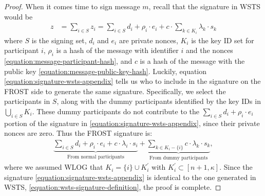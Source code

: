 \documentclass{article}
\theoremstyle{definition}
\theoremstyle{remark}
\begin{document}
\begin{proof}
When it comes time to sign message $m$, recall that the signature in WSTS would be
\begin{align}\label{equation:signature-wsts-appendix}
    z & = \sum_{i \in S}^{} z_{i} 
   = \sum_{i \in S}^{} d_{i} + \rho_{i} \cdot e_{i} + c \cdot \sum_{k \in K_i}^{} \lambda_{k} \cdot s_{k}
\end{align}
where $S$ is the signing set, $d_i$ and $e_i$ are private nonces, $K_i$ is the key ID set for participant $i$, $\rho_i$ is a hash of the message with identifier $i$ and the nonces \eqref{equation:message-participant-hash}, and $c$ is a hash of the message with the public key \eqref{equation:message-public-key-hash}. Luckily, equation \eqref{equation:signature-wsts-appendix} tells us who to include in the signature on the FROST side to generate the same signature. Specifically, we select the participants in $S$, along with the dummy participants identified by the key IDs in $\bigcup_{i \in S} K_i$. These dummy participants do not contribute to the $\sum_{i \in S}^{} d_{i} + \rho_{i} \cdot e_{i}$ portion of the signature in \eqref{equation:signature-wsts-appendix}, since their private nonces are zero. Thus the FROST signature is:
\begin{align}\label{equation:signature-frost-appendix}
   \underbrace{\sum_{i \in S}^{} d_{i} + \rho_{i} \cdot e_{i} + c \cdot \lambda_{i} \cdot s_{i}}_{\text{From normal participants}} + \underbrace{\sum_{k \in K_i - \{i\}}^{} c \cdot \lambda_{k} \cdot s_{k}}_{\text{From dummy participants}},
\end{align}
where we assumed WLOG that $K_i = \{ i \} \cup K_i^{\prime}$ with $K_i^\prime \subset [n + 1, \kappa]$. Since the signature \eqref{equation:signature-wsts-appendix} is identical to the one generated in WSTS, \eqref{equation:wsts-signature-definition}, the proof is complete.
\end{proof}

\end{document}
